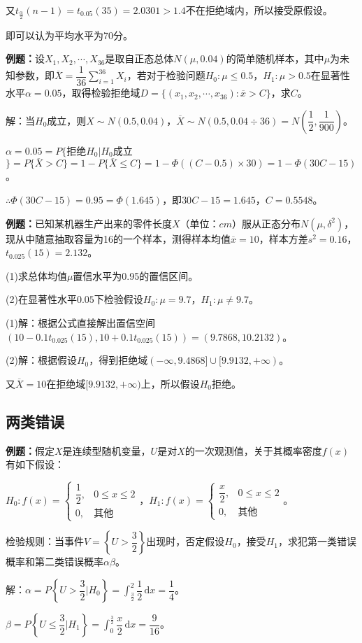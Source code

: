 又$t_{\frac{\alpha}{2}}(n-1)=t_{0.05}(35)=2.0301>1.4$不在拒绝域内，所以接受原假设。

即可以认为平均水平为70分。

\textbf{例题：}设$X_1,X_2,\cdots,X_{36}$是取自正态总体$N(\mu,0.04)$的简单随机样本，其中$\mu$为未知参数，即$\overline{X}=\dfrac{1}{36}\sum\limits_{i=1}^{36}X_i$，若对于检验问题$H_0:\mu\leqslant0.5$，$H_1:\mu>0.5$在显著性水平$\alpha=0.05$，取得检验拒绝域$D=\{(x_1,x_2,\cdots,x_{36}):\overline{x}>C\}$，求$C$。

解：当$H_0$成立，则$X\sim N(0.5,0.04)$，$\overline{X}\sim N(0.5,0.04\div36)=N\left(\dfrac{1}{2},\dfrac{1}{900}\right)$。

$\alpha=0.05=P\{$拒绝$H_0|H_0$成立$\}=P\{\overline{X}>C\}=1-P\{\overline{X}\leqslant C\}=1-\varPhi((C-0.5)\times30)=1-\varPhi(30C-15)$。

$\therefore\varPhi(30C-15)=0.95=\varPhi(1.645)$，即$30C-15=1.645$，$C=0.5548$。

\textbf{例题：}已知某机器生产出来的零件长度$X$（单位：$cm$）服从正态分布$N(\mu,\delta^2)$，现从中随意抽取容量为16的一个样本，测得样本均值$\overline{x}=10$，样本方差$s^2=0.16$，$t_{0.025}(15)=2.132$。

(1)求总体均值$\mu$置信水平为0.95的置信区间。

(2)在显著性水平$0.05$下检验假设$H_0:\mu=9.7$，$H_1:\mu\neq9.7$。

(1)解：根据公式直接解出置信空间$(10-0.1t_{0.025}(15),10+0.1t_{0.025}(15))=(9.7868,10.2132)$。

(2)解：根据假设$H_0$，得到拒绝域$(-\infty,9.4868]\cup[9.9132,+\infty)$。

又$\overline{X}=10$在拒绝域$[9.9132,+\infty)$上，所以假设$H_0$拒绝。

\subsection{两类错误}

\textbf{例题：}假定$X$是连续型随机变量，$U$是对$X$的一次观测值，关于其概率密度$f(x)$有如下假设：

$H_0:f(x)=\left\{\begin{array}{ll}
    \dfrac{1}{2}, & 0\leqslant x\leqslant2 \\
    0, & \text{其他}
\end{array}\right.$，$H_1:f(x)=\left\{\begin{array}{ll}
    \dfrac{x}{2}, & 0\leqslant x\leqslant2 \\
    0, & \text{其他}
\end{array}\right.$。

检验规则：当事件$V=\left\{U>\dfrac{3}{2}\right\}$出现时，否定假设$H_0$，接受$H_1$，求犯第一类错误概率和第二类错误概率$\alpha\beta$。

解：$\alpha=P\left\{U>\dfrac{3}{2}\bigg|H_0\right\}=\displaystyle{\int_\frac{3}{2}^2\dfrac{1}{2}\,\textrm{d}x=\dfrac{1}{4}}$。

$\beta=P\left\{U\leqslant\dfrac{3}{2}\bigg|H_1\right\}=\displaystyle{\int_0^{\frac{3}{2}}\dfrac{x}{2}\,\textrm{d}x=\dfrac{9}{16}}$。
